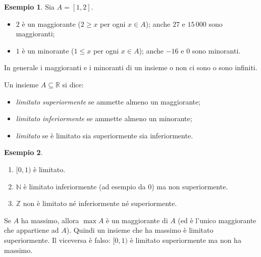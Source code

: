 \documentclass[11pt,a4paper]{article}
\theoremstyle{definition}
\newtheorem*{esempio}{Esempio}
\begin{document}
\begin{esempio}
Sia $A = [1, 2]$.
\begin{itemize}
    \item $2$ è un maggiorante ($2 \geq x$ per ogni $x \in A$); anche $27$ e
          $15\,000$ sono maggioranti;
    \item $1$ è un minorante ($1 \leq x$ per ogni $x \in A$); anche $-16$ e $0$
          sono minoranti.
\end{itemize}
In generale i maggioranti e i minoranti di un insieme o non ci sono o sono
infiniti.
\end{esempio}

\begin{definizione}
Un insieme $A \subseteq \mathbb{R}$ si dice:
\begin{itemize}
    \item \emph{limitato superiormente} se ammette almeno un maggiorante;
    \item \emph{limitato inferiormente} se ammette almeno un minorante;
    \item \emph{limitato} se è limitato sia superiormente sia inferiormente.
\end{itemize}
\end{definizione}

\begin{esempio}
\leavevmode
\begin{enumerate}
    \item $[0, 1)$ è limitato.
    \item $\mathbb{N}$ è limitato inferiormente (ad esempio da $0$) ma non
          superiormente.
    \item $\mathbb{Z}$ non è limitato né inferiormente né superiormente.
\end{enumerate}
\end{esempio}

Se $A$ ha massimo, allora $\max A$ è un maggiorante di $A$ (ed è l'unico
maggiorante che appartiene ad $A$). Quindi un insieme che ha massimo è
limitato superiormente. Il viceversa è falso: $[0, 1)$ è limitato
superiormente ma non ha massimo.
\end{document}
